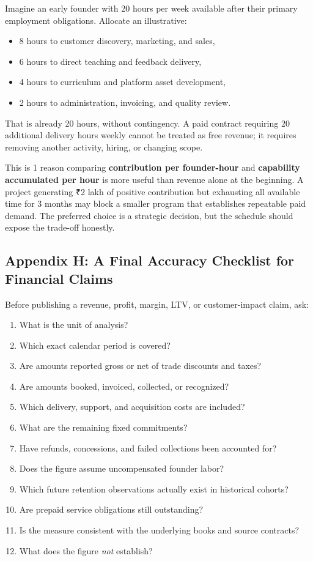 Imagine an early founder with 20 hours per week available after their primary employment obligations. Allocate an illustrative:
\begin{itemize}
  \item 8 hours to customer discovery, marketing, and sales,
  \item 6 hours to direct teaching and feedback delivery,
  \item 4 hours to curriculum and platform asset development,
  \item 2 hours to administration, invoicing, and quality review.
\end{itemize}
That is already 20 hours, without contingency. A paid contract requiring 20 additional delivery hours weekly cannot be treated as free revenue; it requires removing another activity, hiring, or changing scope.

This is 1 reason comparing \textbf{contribution per founder-hour} and \textbf{capability accumulated per hour} is more useful than revenue alone at the beginning. A project generating ₹2 lakh of positive contribution but exhausting all available time for 3 months may block a smaller program that establishes repeatable paid demand. The preferred choice is a strategic decision, but the schedule should expose the trade-off honestly.

\subsection*{Appendix H: A Final Accuracy Checklist for Financial Claims}

Before publishing a revenue, profit, margin, LTV, or customer-impact claim, ask:
\begin{enumerate}
  \item What is the unit of analysis?
  \item Which exact calendar period is covered?
  \item Are amounts reported gross or net of trade discounts and taxes?
  \item Are amounts booked, invoiced, collected, or recognized?
  \item Which delivery, support, and acquisition costs are included?
  \item What are the remaining fixed commitments?
  \item Have refunds, concessions, and failed collections been accounted for?
  \item Does the figure assume uncompensated founder labor?
  \item Which future retention observations actually exist in historical cohorts?
  \item Are prepaid service obligations still outstanding?
  \item Is the measure consistent with the underlying books and source contracts?
  \item What does the figure \emph{not} establish?
\end{enumerate}

